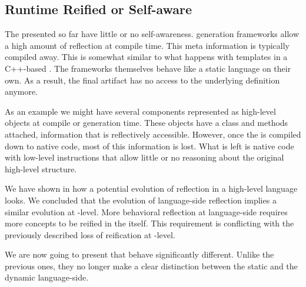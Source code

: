\subsection{Runtime Reified or Self-aware \VMs}

The \VMs presented so far have little or no self-awareness.
\VM generation frameworks allow a high amount of reflection at \VM compile time.
This meta information is typically compiled away.
This is somewhat similar to what happens with templates in a C++-based \VM.
The \VM frameworks themselves behave like a static language on their own.
As a result, the final \VM artifact has no access to the underlying definition anymore.

As an example we might have several \VM components represented as high-level objects at compile or \VM generation time.
These objects have a class and methods attached, information that is reflectively accessible.
However, once the \VM is compiled down to native code, most of this information is lost.
What is left is native code with low-level instructions that allow little or no reasoning about the original high-level structure.

We have shown in  how a potential evolution of reflection in a high-level language looks.
We concluded that the evolution of language-side reflection implies a similar evolution at \VM-level.
More behavioral reflection at language-side requires more concepts to be reified in the \VM itself.
This requirement is conflicting with the previously described loss of reification at \VM-level.

We are now going to present \VMs that behave significantly different.
Unlike the previous ones, they no longer make a clear distinction between the static \VM and the dynamic language-side.


\subsubsection*{\DwarfPython}

